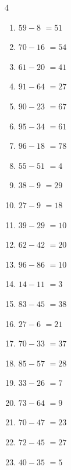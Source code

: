 \begin{multicols}{4}
\begin{enumerate}
  \item $59-8$
        $=51$

  \item $70-16$
        $=54$

  \item $61-20$
        $=41$

\columnbreak %

  \item $91-64$
        $=27$

  \item $90-23$
        $=67$

  \item $95-34$
        $=61$

  \item $96-18$
        $=78$

  \item $55-51$
        $=4$

  \item $38-9$
        $=29$

  \item $27-9$
        $=18$

  \item $39-29$
        $=10$

  \item $62-42$
        $=20$

  \item $96-86$
        $=10$

  \item $14-11$
        $=3$

  \item $83-45$
        $=38$

  \item $27-6$
        $=21$

  \item $70-33$
        $=37$

  \item $85-57$
        $=28$

  \item $33-26$
        $=7$

  \item $73-64$
        $=9$

  \item $70-47$
        $=23$

  \item $72-45$
        $=27$

  \item $40-35$
        $=5$


\end{enumerate}
\end{multicols}
